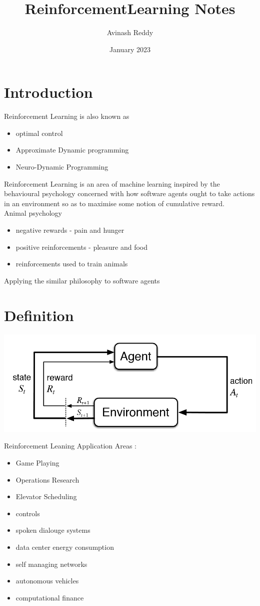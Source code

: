 \documentclass{article}
\title{ReinforcementLearning Notes}
\author{Avinash Reddy}
\date{January 2023}
\begin{document}
\maketitle

\section{Introduction}

Reinforcement Learning is also known as 
\begin{itemize}
    \item optimal control
    \item Approximate Dynamic programming
    \item Neuro-Dynamic Programming
\end{itemize}
Reinforcement Learning is an area of machine learning inspired by the behavioural psychology
concerned with how software agents ought to take actions in an environment so as to maximise 
some notion of cumulative reward.
\vspace{1pt}
\\
Animal psychology
\begin{itemize}
    \item negative rewards - pain and hunger
    \item positive reinforcements - pleasure and food
    \item reinforcements used to train animals
\end{itemize}
Applying the similar philosophy to software agents
\section{Definition}
\begin{center}
    \includegraphics*[scale = 0.3]{images/rl.png}   
\end{center}
\newpage
Reinforcement Leaning Application Areas : 
\begin{itemize}
    \item Game Playing
    \item Operations Research
    \item Elevator Scheduling
    \item controls 
    \item spoken dialouge systems
    \item data center energy consumption
    \item self managing networks
    \item autonomous vehicles
    \item computational finance
\end{itemize}
\end{document}
